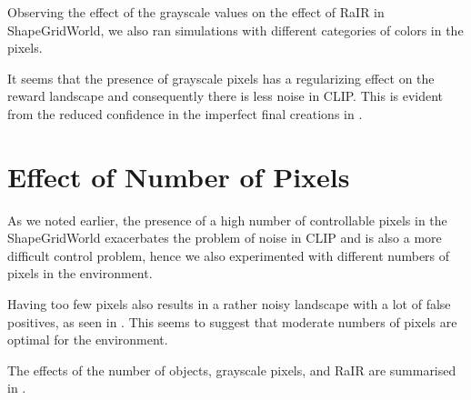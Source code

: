 Observing the effect of the grayscale values on the effect of RaIR in ShapeGridWorld, we also ran simulations with different categories of colors in the pixels.

It seems that the presence of grayscale pixels has a regularizing effect on the reward landscape and consequently there is less noise in CLIP.
This is evident from the reduced confidence in the imperfect final creations in .

\section{Effect of Number of Pixels}
\label{sec:sgw-pixels}

As we noted earlier, the presence of a high number of controllable pixels in the ShapeGridWorld exacerbates the problem of noise in CLIP and is also a more difficult control problem, hence we also experimented with different numbers of pixels in the environment.

Having too few pixels also results in a rather noisy landscape with a lot of false positives, as seen in .
This seems to suggest that moderate numbers of pixels are optimal for the environment.

The effects of the number of objects, grayscale pixels, and RaIR are summarised in .

